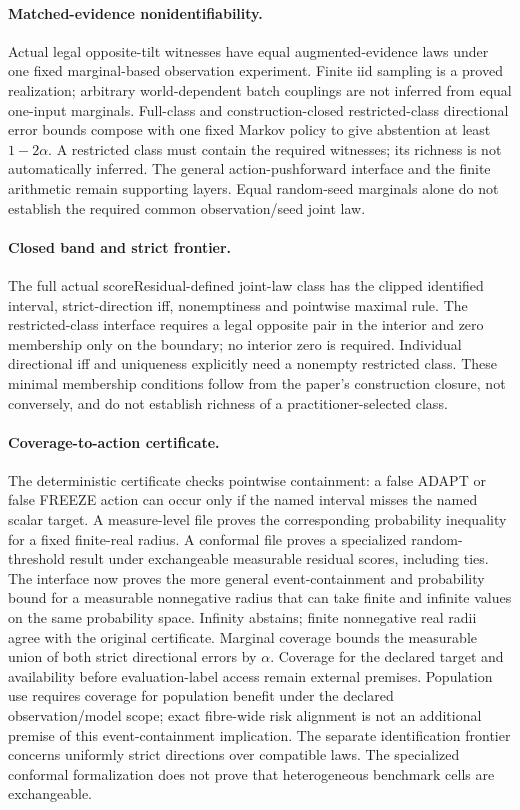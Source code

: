 \paragraph{Matched-evidence nonidentifiability.}
Actual legal opposite-tilt witnesses have equal augmented-evidence laws under one fixed
marginal-based observation experiment. Finite iid sampling is a proved realization; arbitrary
world-dependent batch couplings are not inferred from equal one-input marginals. Full-class and
construction-closed restricted-class directional error bounds compose with one fixed Markov
policy to give abstention at least $1-2\alpha$. A restricted class must contain the required
witnesses; its richness is not automatically inferred. The general action-pushforward interface
and the finite  arithmetic remain supporting layers. Equal random-seed
marginals alone do not establish the required common observation/seed joint law.

\paragraph{Closed band and strict frontier.}
The full actual scoreResidual-defined joint-law class has the clipped identified interval,
strict-direction iff, nonemptiness and pointwise maximal rule. The restricted-class interface
requires a legal opposite pair in the interior and zero membership only on the boundary; no
interior zero is required. Individual directional iff and uniqueness explicitly need a nonempty
restricted class. These minimal membership conditions follow from the paper's construction
closure, not conversely, and do not establish richness of a practitioner-selected class.

\paragraph{Coverage-to-action certificate.}
The deterministic certificate checks pointwise containment: a false ADAPT or false FREEZE action
can occur only if the named interval misses the named scalar target.  A measure-level file proves
the corresponding probability inequality for a fixed finite-real radius.  A conformal file proves
a specialized random-threshold result under exchangeable measurable residual scores, including
ties.  The  interface now proves the more general
event-containment and probability bound for a measurable nonnegative radius that can take finite
and infinite values on the same probability space.  Infinity abstains; finite nonnegative real
radii agree with the original certificate.  Marginal coverage bounds the measurable union of
both strict directional errors by $\alpha$. Coverage for the declared target and availability
before evaluation-label access remain external premises. Population use requires coverage for
population benefit under the declared observation/model scope; exact fibre-wide risk alignment
is not an additional premise of this event-containment implication. The separate identification
frontier concerns uniformly strict directions over compatible laws. The specialized conformal
formalization does not prove that heterogeneous benchmark cells are exchangeable.

